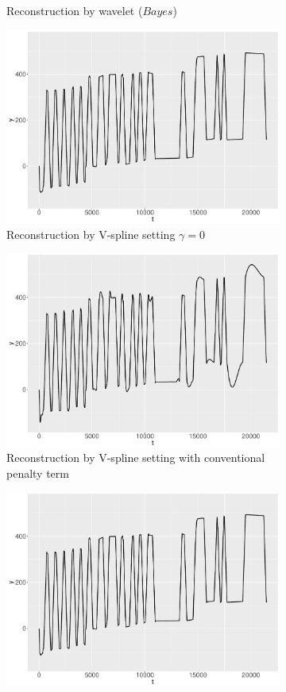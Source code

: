 \begin{figure}
\begin{subfigure}{0.45\textwidth}
    \caption{Reconstruction by wavelet ($\textit{Bayes}$) }\label{ggRealdataYBayes}
    \end{subfigure}
    \begin{subfigure}{0.45\textwidth}
    \centering
    \includegraphics[width=\linewidth,height=0.5\textwidth]{Chapters/02TractorSplineTheory/plot/ggplot/ggRealdataYTractorGamma.pdf}
    \caption{Reconstruction by V-spline setting  $\gamma=0$ }\label{ggRealdataYTractorGamma}
    \end{subfigure}
    \begin{subfigure}{0.45\textwidth}
    \centering
    \includegraphics[width=\linewidth,height=0.5\textwidth]{Chapters/02TractorSplineTheory/plot/ggplot/ggRealdataYTractorAPT.pdf}
    \caption{Reconstruction by V-spline setting with conventional penalty term}\label{ggRealdataYTractorAPT}
    \end{subfigure}
    \begin{subfigure}{0.45\textwidth}
    \centering
    \includegraphics[width=\linewidth,height=0.5\textwidth]{Chapters/02TractorSplineTheory/plot/ggplot/ggRealdataYTractor.pdf}

\end{subfigure}
\end{figure}
